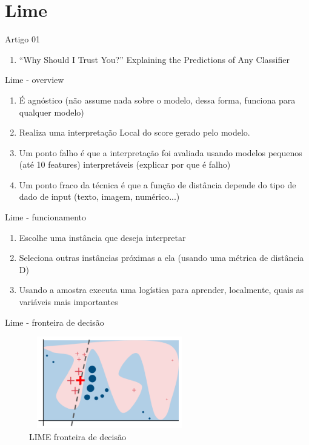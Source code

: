 \section{Lime}

\begin{frame}
	\begin{block}{Artigo 01}
	\begin{enumerate}
		\item ``Why Should I Trust You?'' Explaining the Predictions of Any Classifier
	\end{enumerate}
	\end{block}
\end{frame}


\begin{frame}
	\begin{block}{Lime - overview}
	\begin{enumerate}
		\item É agnóstico (não assume nada sobre o modelo, dessa forma, funciona para qualquer modelo)
		\item Realiza uma interpretação Local do score gerado pelo modelo.
		\item Um ponto falho é que a interpretação foi avaliada usando modelos pequenos (até 10 features) interpretáveis (explicar por que é falho) 
		\item Um ponto fraco da técnica é que a função de distância depende do tipo de dado de input (texto, imagem, numérico...)
	\end{enumerate}
	\end{block}
\end{frame}


\begin{frame}
	\begin{block}{Lime - funcionamento}
		\begin{enumerate}
			\item Escolhe uma instância que deseja interpretar
			\item Seleciona outras instâncias próximas a ela (usando uma métrica de distância D)
			\item Usando a amostra executa uma logística para aprender, localmente, quais as variáveis mais importantes
		\end{enumerate}
	\end{block}
\end{frame}


\begin{frame}
	\begin{block}{Lime - fronteira de decisão}
		\begin{figure}[!htb]
			\centering	  				
			\includegraphics[height=4cm, width = 7cm]{./pic/lime2.png}
			\caption{LIME fronteira de decisão \cite{LIME} }
			\label{fig_ds_process}
		\end{figure}	
	\end{block}
\end{frame}





